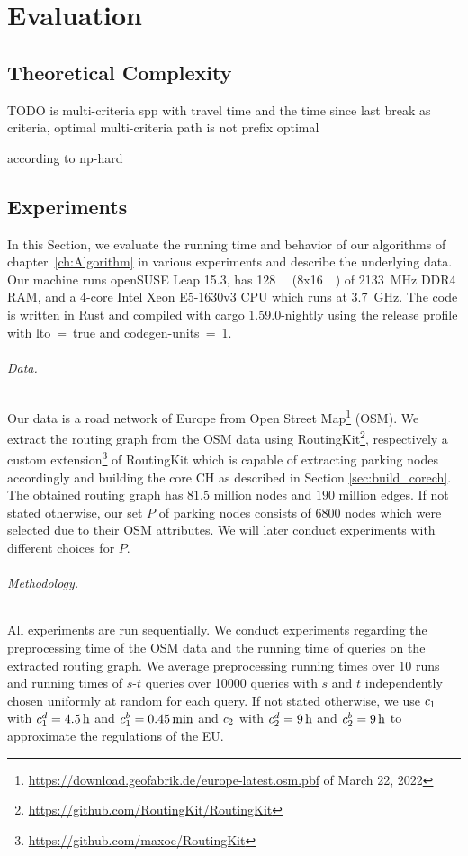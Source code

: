 
\chapter{Evaluation\label{ch:Evaluation}}
\section{Theoretical Complexity}
TODO is multi-criteria spp with travel time and the time since last break as criteria, optimal multi-criteria path is not prefix optimal  \cite{tuin:2018}

according to \cite{hansen:1980} np-hard

\section{Experiments}
In this Section, we evaluate the running time and behavior of our algorithms of chapter~\ref{ch:Algorithm} in various experiments and describe the underlying data. Our machine runs openSUSE Leap 15.3, has \SI{128}{\giga\byte} (8x\SI{16}{\giga\byte}) of \SI{2133}{\mega\hertz} DDR4 RAM, and a 4-core Intel Xeon E5-1630v3 CPU which runs at \SI{3.7}{\giga\hertz}. The code is written in Rust and compiled with cargo 1.59.0-nightly using the release profile with lto~=~true and codegen-units~=~1.

\subparagraph{Data.} Our data is a road network of Europe from Open Street Map\footnote{\url{https://download.geofabrik.de/europe-latest.osm.pbf} of March 22, 2022} (OSM). We extract the routing graph from the OSM data using RoutingKit\footnote{\url{https://github.com/RoutingKit/RoutingKit}}, respectively a custom extension\footnote{\url{https://github.com/maxoe/RoutingKit}} of RoutingKit which is capable of extracting parking nodes accordingly and building the core CH as described in Section \ref{sec:build_corech}. The obtained routing graph has $81.5$ million nodes and $190$ million edges. If not stated otherwise, our set $P$ of parking nodes consists of 6800 nodes which were selected due to their OSM attributes. We will later conduct experiments with different choices for $P$.

\subparagraph{Methodology.} All experiments are run sequentially. We conduct experiments regarding the preprocessing time of the OSM data and the running time of queries on the extracted routing graph. We average preprocessing running times over \num{10} runs and running times of $s$-$t$ queries over \num{10000} queries with $s$ and $t$ independently chosen uniformly at random for each query. If not stated otherwise, we use $c_1$ with $c_1^d = \SI{4.5}{\hour}$ and $c_1^b = \SI{0.45}{\minute}$ and $c_2$ with $c_2^d = \SI{9}{\hour}$ and $c_2^b = \SI{9}{\hour}$ to approximate the regulations of the EU.

